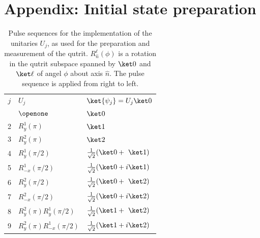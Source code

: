 \documentclass[12pt,
onecolumn,
superscriptaddress,
floatfix,
]{revtex4-2}
\begin{document}
\section{Appendix: Initial state preparation}
\begin{table}[h]
\centering
\begin{ruledtabular}
\begin{tabular}{cll}
$j$ & $U_j$ & $\ket{\psi_j} = U_j\ket0$ \\
\colrule
1 & $\openone$ & $\ket0$ \\
2 & $R^1_y(\pi)$ & $\ket1$ \\
3 & $R^2_y(\pi)$ & $\ket2$ \\
4 & $R^1_y(\pi/2)$ & $\frac{1}{\sqrt{2}}(\ket0+\phantom{i}\ket1)$ \\
5 & $R^1_{-x}(\pi/2)$ & $\frac{1}{\sqrt{2}}(\ket0+i\ket1)$ \\
6 & $R^2_y(\pi/2)$ & $\frac{1}{\sqrt{2}}(\ket0+\phantom{i}\ket2)$ \\
7 & $R^2_{-x}(\pi/2)$ & $\frac{1}{\sqrt{2}}(\ket0+i\ket2)$ \\
8 & $R^2_y(\pi) R^1_y(\pi/2)$ & $\frac{1}{\sqrt{2}}(\ket1+\phantom{i}\ket2)$ \\
9 & $R^2_{y}(\pi) R^1_{-x}(\pi/2)$ & $\frac{1}{\sqrt{2}}(\ket1+i\ket2)$ \\
\end{tabular}
\end{ruledtabular}
\caption{\label{tab:tomography}%
Pulse sequences for the implementation of the unitaries $U_j$, as used for the 
 preparation and measurement of the qutrit.
$R^{\ell}_{\hat{n}}(\phi)$ is a rotation in the qutrit subspace spanned by 
 $\ket0$ and $\ket\ell$ of angel $\phi$ about axis $\hat{n}$.
The pulse sequence is applied from right to left.}
\end{table}
\end{document}
